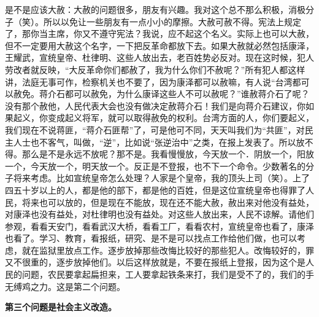 是不是应该大赦：大赦的问题很多，朋友有兴趣。我对这个总不那么积极，消极分子（笑）。所以以免让一些朋友有一点小小的摩擦。大赦可赦不得。宪法上规定了，那你当主席，你又不遵守宪法？我说，应不起这个名义。实际上也可以大赦，但不一定要用大赦这个名字，一下把反革命都放下去。如果大赦就必然包括康泽，王耀武，宣统皇帝、杜律明、这些人放出去，老百姓势必反对。现在这时候，犯人劳改者就反映，“大反革命你们都赦了，我为什么你们不赦呢？”所有犯人都这样讲，法庭无事可作，检察机关也不要了，因为康泽都可以赦嘛，有人说“台湾都可以赦免。蒋介石都可以赦免，为什么康译这些人不可以赦呢？”谁赦蒋介石了呢？没有那个赦他，人民代表大会也没有做决定赦蒋介石！我们是向蒋介石建议，你如果起义，你变成起义将军，就可以取得赦免的权利。台湾方面的人，你们要起义，我们现在不说蒋匪，“蒋介石匪帮”了，可是他可不同，天天叫我们为“共匪”，对民主人士也不客气，叫做，“逆”，比如说“张逆治中”之类，在报上发表了。所以放不得。那么是不是永远不放呢？那不是。我看慢慢放，今天放一个．阴放一个，阳放一个，今天放一个，明天放一个。反正是不登报，也不下一个命令。少数著名的分子将来考虑。比如宣统皇帝怎么处理？人家是个皇帝，我的顶头上司（笑）。上了四五十岁以上的人，都是他的部下，都是他的百姓，但是这位宣统皇帝也得罪了人民，将来也可以放的，但是现在不能放，现在还不能大赦，赦出来对他没有益处，对康泽也没有益处，对杜律明也没有益处。对这些人放出来，人民不谅解。请他们参观，看看天安门，看看武汉大桥，看看工厂，看看农村，宣统皇帝也看了，康泽也看了。学习、教育，看报纸，研究、是不是可以找点工作给他们做，也可以考虑，就在监狱里放点工作。逐步放掉那些改悔比较好的那些犯人。改悔较好的，罪又不很重的，逐步放掉他们。以后这样放就是，不要在报纸上登报，因为这个是人民的问题，农民要拿起扁担来，工人要拿起铁条来打，我们是受不了的，我们的手无缚鸡之力。这是第二个问题。

\textbf{第三个问题是社会主义改造。}

